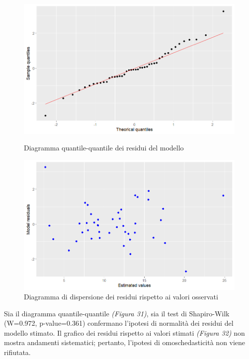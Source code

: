 \documentclass{article} %
\begin{document}
\begin{figure}[H]
    \centering
    \begin{minipage}{0.49\textwidth}
        \centering
        \includegraphics[width=\textwidth]{immagini/qq_glm.png}
        \captionsetup{justification=centering}
        \caption{Diagramma quantile-quantile dei residui del modello}
    \end{minipage}
    \hfill
    \begin{minipage}{0.49\textwidth}
        \centering
        \includegraphics[width=\textwidth]{immagini/res_glm.png}
        \captionsetup{justification=centering}
        \caption{Diagramma di dispersione dei residui rispetto ai valori osservati}
    \end{minipage}
\end{figure}

Sia il diagramma quantile-quantile \textit{(Figura 31)}, sia il test di Shapiro-Wilk (W=0.972, p-value=0.361) confermano l'ipotesi di normalità dei residui del modello stimato. Il grafico dei residui rispetto ai valori stimati \textit{(Figura 32)} non mostra andamenti sistematici; pertanto, l'ipotesi di omoschedasticità non viene rifiutata.
\end{document}
